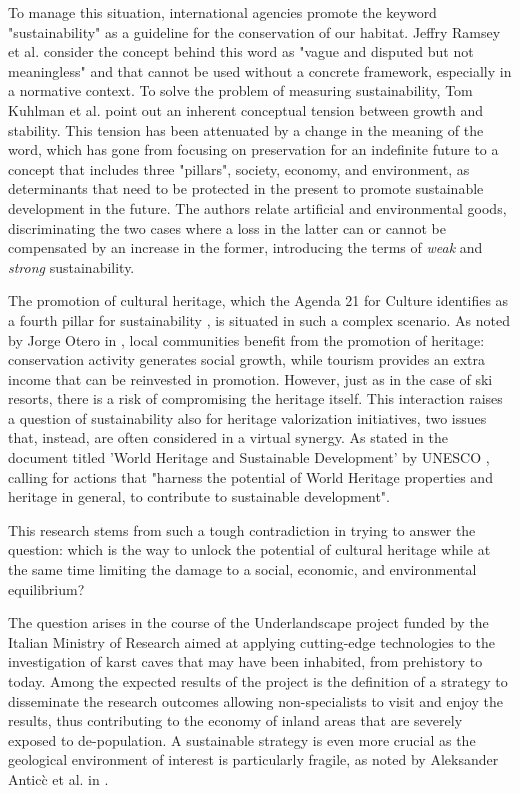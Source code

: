 \documentclass[sustainability,article,submit,pdftex,moreauthors]{Definitions/mdpi}
\begin{document}
To manage this situation, international agencies promote the keyword "sustainability" as a guideline for the conservation of our habitat. Jeffry Ramsey et al. \cite{ram15a} consider the concept behind this word as "vague and disputed but not meaningless" and that cannot be used without a concrete framework, especially in a normative context. To solve the problem of measuring sustainability, Tom Kuhlman et al. \cite{kuh10a} point out an inherent conceptual tension between growth and stability. This tension has been attenuated by a change in the meaning of the word, which has gone from focusing on preservation for an indefinite future to a concept that includes three "pillars", society, economy, and environment, as determinants that need to be protected in the present to promote sustainable development in the future. The authors relate artificial and environmental goods, discriminating the two cases where a loss in the latter can or cannot be compensated by an increase in the former, introducing the terms of {\em weak} and {\em strong} sustainability.

The promotion of cultural heritage, which the Agenda 21 for Culture identifies as a fourth pillar for sustainability \cite{fourthpillar}, is situated in such a complex scenario. As noted by Jorge Otero in \cite{ote22a}, local communities benefit from the promotion of heritage: conservation activity generates social growth, while tourism provides an extra income that can be reinvested in promotion. However, just as in the case of ski resorts, there is a risk of compromising the heritage itself. This interaction raises a question of sustainability also for heritage valorization initiatives, two issues that, instead,  are often considered in a virtual synergy. As stated in the document titled 'World Heritage and Sustainable Development' by UNESCO \cite{lab17a}, calling for actions that "harness the potential of World Heritage properties and heritage in general, to contribute to sustainable development".

This research stems from such a tough contradiction in trying to answer the question: which is the way to unlock the potential of cultural heritage while at the same time limiting the damage to a social, economic, and environmental equilibrium?

The question arises in the course of the Underlandscape project  funded by the Italian Ministry of Research aimed at applying cutting-edge technologies to the investigation of karst caves that may have been inhabited, from prehistory to today. Among the expected results of the project is the definition of a strategy to disseminate the research outcomes allowing non-specialists to visit and enjoy the results, thus contributing to the economy of inland areas that are severely exposed to de-population. A sustainable strategy is even more crucial as the geological environment of interest is particularly fragile, as noted by Aleksander Antic\`c et al. in \cite{ant20a}.
\end{document}
